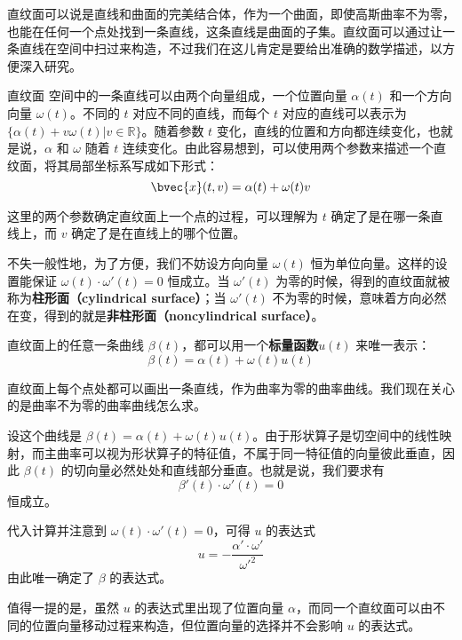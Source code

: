 

直纹面可以说是直线和曲面的完美结合体，作为一个曲面，即使高斯曲率不为零，也能在任何一个点处找到一条直线，这条直线是曲面的子集。直纹面可以通过让一条直线在空间中扫过来构造，不过我们在这儿肯定是要给出准确的数学描述，以方便深入研究。

\begin{definition}{直纹面}
空间中的一条直线可以由两个向量组成，一个位置向量 $\alpha(t)$ 和一个方向向量 $\omega(t)$。不同的 $t$ 对应不同的直线，而每个 $t$ 对应的直线可以表示为 $\{\alpha(t)+v\omega(t)|v\in\mathbb{R}\}$。随着参数 $t$ 变化，直线的位置和方向都连续变化，也就是说，$\alpha$ 和 $\omega$ 随着 $t$ 连续变化。由此容易想到，可以使用两个参数来描述一个直纹面，将其局部坐标系写成如下形式：
\begin{equation}
\bvec{x}(t, v)=\alpha(t)+\omega(t)v
\end{equation}
\end{definition}


这里的两个参数确定直纹面上一个点的过程，可以理解为 $t$ 确定了是在哪一条直线上，而 $v$ 确定了是在直线上的哪个位置。

不失一般性地，为了方便，我们不妨设方向向量 $\omega(t)$ 恒为单位向量。这样的设置能保证 $\omega(t)\cdot\omega'(t)=0$ 恒成立。当 $\omega'(t)$ 为零的时候，得到的直纹面就被称为\textbf{柱形面（cylindrical surface）}；当 $\omega'(t)$ 不为零的时候，意味着方向必然在变，得到的就是\textbf{非柱形面（noncylindrical surface）}。

直纹面上的任意一条曲线 $\beta(t)$，都可以用一个\textbf{标量函数}$u(t)$ 来唯一表示：\begin{equation}
\beta(t)=\alpha(t)+\omega(t)u(t)
\end{equation}

直纹面上每个点处都可以画出一条直线，作为曲率为零的曲率曲线。我们现在关心的是曲率不为零的曲率曲线怎么求。

设这个曲线是 $\beta(t)=\alpha(t)+\omega(t)u(t)$。由于形状算子是切空间中的线性映射，而主曲率可以视为形状算子的特征值，不属于同一特征值的向量彼此垂直，因此 $\beta(t)$ 的切向量必然处处和直线部分垂直。也就是说，我们要求有
\begin{equation}
\beta'(t)\cdot\omega'(t)=0
\end{equation}
恒成立。

代入计算并注意到 $\omega(t)\cdot\omega'(t)=0$，可得 $u$ 的表达式\begin{equation}
u=-\frac{\alpha'\cdot\omega'}{\omega'^2}
\end{equation}
由此唯一确定了 $\beta$ 的表达式。

值得一提的是，虽然 $u$ 的表达式里出现了位置向量 $\alpha$，而同一个直纹面可以由不同的位置向量移动过程来构造，但位置向量的选择并不会影响 $u$ 的表达式。




